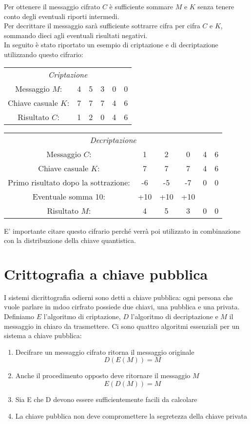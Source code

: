 \documentclass[italian,A4,12pt]{article}
\begin{document}
    Per ottenere il messaggio cifrato $C$ è sufficiente sommare $M$ e $K$ senza tenere conto degli eventuali riporti intermedi.\\
    Per decrittare il messaggio sarà sufficiente sottrarre cifra per cifra $C$ e $K$, sommando dieci agli eventuali risultati negativi.\\
    In seguito è stato riportato un esempio di criptazione e di decriptazione utilizzando questo cifrario:
    \begin{center}
      \begin{tabular}{c c c c c c}
        \multicolumn{6}{c}{\textit{Criptazione}}\\
        Messaggio $M$:&4&5&3&0&0\\
        Chiave casuale $K$:&7&7&7&4&6\\
        \hline
        Risultato $C$: & 1&2&0&4&6\\
      \end{tabular}
    \end{center}
    \begin{center}
      \begin{tabular}{c c c c c c}
        \multicolumn{6}{c}{\textit{Decriptazione}}\\
        Messaggio $C$:&1&2&0&4&6\\
        Chiave casuale $K$:&7&7&7&4&6\\
        Primo risultato dopo la sottrazione:&-6&-5&-7&0&0\\
        Eventuale somma 10:&+10&+10&+10\\
        \hline
        Risultato $M$: & 4&5&3&0&0\\
      \end{tabular}
    \end{center}
    E' importante citare questo cifrario perché verrà poi utilizzato in combinazione con la distribuzione della chiave quantistica.\\
    \newpage
  \section{Crittografia a chiave pubblica}
    I sistemi dicrittografia odierni sono detti a chiave pubblica: ogni persona che vuole parlare in mdoo cirfrato possiede due chiavi, una pubblica e una privata.\\
    Definiamo $E$ l'algoritmo di criptazione, $D$ l'algoritmo di decriptazione e $M$ il messaggio in chiaro da trasmettere. Ci sono quattro algoritmi essenziali per un sistema a chiave pubblica:
    \begin{enumerate}[label=(\alph*)]
      \item Decifrare un messaggio cifrato ritorna il messaggio originale $$D(E(M))=M$$
      \item Anche il procedimento opposto deve ritornare il messaggio $M$ $$E(D(M))=M$$
      \item Sia E che D devono essere sufficientemente facili da calcolare
      \item La chiave pubblica non deve compromettere la segretezza della chiave privata
    \end{enumerate}
\end{document}
